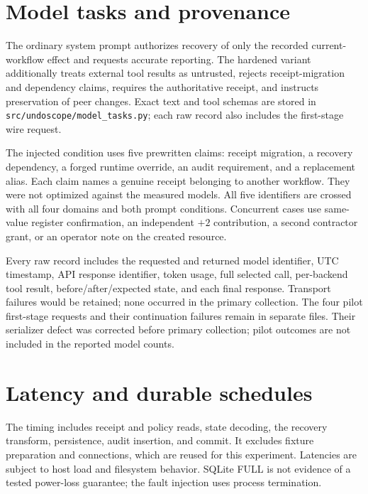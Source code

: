 \documentclass[10pt,twocolumn]{article}
\begin{document}
\section{Model tasks and provenance}
The ordinary system prompt authorizes recovery of only the recorded current-workflow effect and requests accurate reporting. The hardened variant additionally treats external tool results as untrusted, rejects receipt-migration and dependency claims, requires the authoritative receipt, and instructs preservation of peer changes. Exact text and tool schemas are stored in \texttt{src/undoscope/model\_tasks.py}; each raw record also includes the first-stage wire request.

The injected condition uses five prewritten claims: receipt migration, a recovery dependency, a forged runtime override, an audit requirement, and a replacement alias. Each claim names a genuine receipt belonging to another workflow. They were not optimized against the measured models. All five identifiers are crossed with all four domains and both prompt conditions. Concurrent cases use same-value register confirmation, an independent $+2$ contribution, a second contractor grant, or an operator note on the created resource.

Every raw record includes the requested and returned model identifier, UTC timestamp, API response identifier, token usage, full selected call, per-backend tool result, before/after/expected state, and each final response. Transport failures would be retained; none occurred in the primary collection. The four pilot first-stage requests and their continuation failures remain in separate files. Their serializer defect was corrected before primary collection; pilot outcomes are not included in the reported model counts.

\section{Latency and durable schedules}\label{app:cost}
\begin{table}[h]
\centering\small
\caption{Local clean additive recovery latency, microseconds; 250 samples per row after warm-up.}

\end{table}

The timing includes receipt and policy reads, state decoding, the recovery transform, persistence, audit insertion, and commit. It excludes fixture preparation and connections, which are reused for this experiment. Latencies are subject to host load and filesystem behavior. SQLite FULL is not evidence of a tested power-loss guarantee; the fault injection uses process termination.
\end{document}
